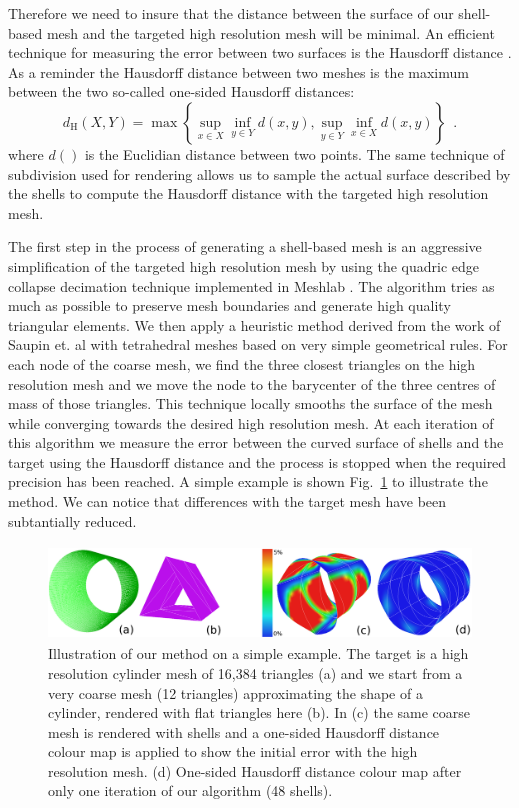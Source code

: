 \documentclass{llncs}
\begin{document}
Therefore we need to insure that the distance between the surface of our shell-based mesh and the targeted high resolution mesh will be minimal. An efficient technique for measuring the error between two surfaces is the Hausdorff distance \cite{Klein96,Cignoni98}. As a reminder the Hausdorff distance between two meshes is the maximum between the two so-called one-sided Hausdorff distances:
\begin{equation}
d_{\mathrm{H}}(X,Y) = \max \left\{ \sup_{x \in X} \inf_{y \in Y} d(x,y), \sup_{y \in Y} \inf_{x \in X} d(x,y) \right\} \enspace .
\end{equation}
where $d()$ is the Euclidian distance between two points. The same technique of subdivision used for rendering allows us to sample the actual surface described by the shells to compute the Hausdorff distance with the targeted high resolution mesh. 

The first step in the process of generating a shell-based mesh is an aggressive simplification of the targeted high resolution mesh by using the quadric edge collapse decimation technique implemented in Meshlab \cite{Meshlab}. The algorithm tries as much as possible to preserve mesh boundaries and generate high quality triangular elements. We then apply a heuristic method derived from the work of Saupin et. al \cite{Saupin07} with tetrahedral meshes based on very simple geometrical rules. For each node of the coarse mesh, we find the three closest triangles on the high resolution mesh and we move the node to the barycenter of the three centres of mass of those triangles. This technique locally smooths the surface of the mesh while converging towards the desired high resolution mesh. At each iteration of this algorithm we measure the error between the curved surface of shells and the target using the Hausdorff distance and the process is stopped when the required precision has been reached. A simple example is shown Fig.~\ref{fig-cylinder} to illustrate the method. We can notice that differences with the target mesh have been subtantially reduced.

\begin{figure}
\centering
\includegraphics[height=2.5cm]{images/exampleCylinder}
\caption {Illustration of our method on a simple example. The target is a high resolution cylinder mesh of 16,384 triangles (a) and we start from a very coarse mesh (12 triangles) approximating the shape of a cylinder, rendered with flat triangles here (b). In (c) the same coarse mesh is rendered with shells and a one-sided Hausdorff distance colour map is applied to show the initial error with the high resolution mesh. (d) One-sided Hausdorff distance colour map after only one iteration of our algorithm (48 shells).}
\label{fig-cylinder}
\end{figure}
\end{document}
